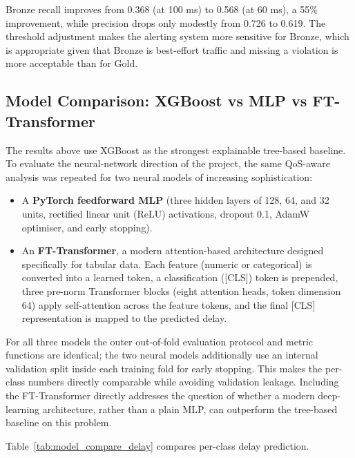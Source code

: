 \documentclass[a4paper,12pt]{Classes/RoboticsLaTeX}
\begin{document}
Bronze recall improves from 0.368 (at 100 ms) to 0.568 (at 60 ms), a 55\% improvement, while precision drops only modestly from 0.726 to 0.619. The threshold adjustment makes the alerting system more sensitive for Bronze, which is appropriate given that Bronze is best-effort traffic and missing a violation is more acceptable than for Gold.

\subsection{Model Comparison: XGBoost vs MLP vs FT-Transformer}

The results above use XGBoost as the strongest explainable tree-based baseline. To evaluate the neural-network direction of the project, the same QoS-aware analysis was repeated for two neural models of increasing sophistication:

\begin{itemize}
    \item A \textbf{PyTorch feedforward MLP} (three hidden layers of 128, 64, and 32 units, rectified linear unit (ReLU) activations, dropout 0.1, AdamW optimiser, and early stopping).
    \item An \textbf{FT-Transformer}, a modern attention-based architecture designed specifically for tabular data. Each feature (numeric or categorical) is converted into a learned token, a classification ([CLS]) token is prepended, three pre-norm Transformer blocks (eight attention heads, token dimension 64) apply self-attention across the feature tokens, and the final [CLS] representation is mapped to the predicted delay.
\end{itemize}

For all three models the outer out-of-fold evaluation protocol and metric functions are identical; the two neural models additionally use an internal validation split inside each training fold for early stopping. This makes the per-class numbers directly comparable while avoiding validation leakage. Including the FT-Transformer directly addresses the question of whether a modern deep-learning architecture, rather than a plain MLP, can outperform the tree-based baseline on this problem.

Table~\ref{tab:model_compare_delay} compares per-class delay prediction.
\end{document}
